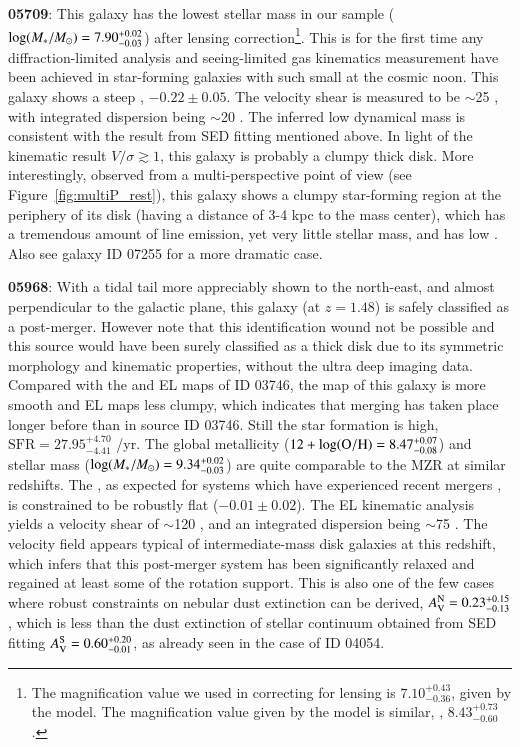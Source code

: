 {\bf 05709}: This galaxy has the lowest stellar mass in our \mg sample ($\log(M_\ast/M_\odot)=7.90_{-0.03}^{+0.02}$) after
lensing correction\footnote{The magnification value we used in correcting for lensing is $7.10_{-0.36}^{+0.43}$, given by the
\glafic model.  The magnification value given by the \SJ model is similar, \ie, $8.43_{-0.60}^{+0.73}$.}. This is for the first
time any diffraction-limited \mg analysis and seeing-limited gas kinematics measurement have been achieved in star-forming
galaxies with such small \Mstar at the cosmic noon. This galaxy shows a steep \mg, \ie $-0.22\pm0.05$.
The velocity shear is measured to be $\sim$25 \kms, with integrated dispersion being $\sim$20 \kms. The inferred low dynamical
mass is consistent with the result from SED fitting mentioned above. In light of the kinematic result $V/\sigma \gtrsim 1$, this
galaxy is probably a clumpy thick disk.  More interestingly, observed from a multi-perspective point of view (see
Figure~\ref{fig:multiP_rest}), this galaxy shows a clumpy star-forming region at the periphery of its disk (having a distance of
3-4 kpc to the mass center), which has a tremendous amount of line emission, yet very little stellar mass, and has low \gpm. Also
see galaxy ID 07255 for a more dramatic case.

{\bf 05968}: With a tidal tail more appreciably shown to the north-east, and almost perpendicular to the galactic plane, this
galaxy (at $z=1.48$) is safely classified as a post-merger. However note that this identification wound not be possible and this
source would have been surely classified as a thick disk due to its symmetric morphology and kinematic properties, without the
ultra deep \hff imaging data.
Compared with the \Mstar and EL maps of ID 03746, the \Mstar map of this galaxy is more smooth and EL maps less clumpy, which
indicates that merging has taken place longer before than in source ID 03746.  Still the star formation is high, \ie
$\textrm{SFR}=27.95_{-4.41}^{+4.70}$ \Msun/yr.  The global metallicity ($12+\log({\rm O/H})=8.47_{-0.08}^{+0.07}$) and stellar mass
($\log(M_\ast/M_\odot)=9.34_{-0.03}^{+0.02}$) are quite comparable to the MZR at similar redshifts.  The \mg, as expected for
systems which have experienced recent mergers \citep[see \eg][]{Kewley:2010eg}, is constrained to be robustly flat
($-0.01\pm0.02$).  The EL kinematic analysis yields a velocity shear of $\sim$120 \kms, and an integrated dispersion being
$\sim$75 \kms. The velocity field appears typical of intermediate-mass disk galaxies at this redshift, which infers that this
post-merger system has been significantly relaxed and regained at least some of the rotation support.  This is also one of the few
cases where robust constraints on nebular dust extinction can be derived, \ie $A_{\rm V}^{\rm N}=0.23^{+0.15}_{-0.13}$, which is
less than the dust extinction of stellar continuum obtained from SED fitting $A_{\rm V}^{\rm S}=0.60_{-0.01}^{+0.20}$, as already seen
in the case of ID 04054.

